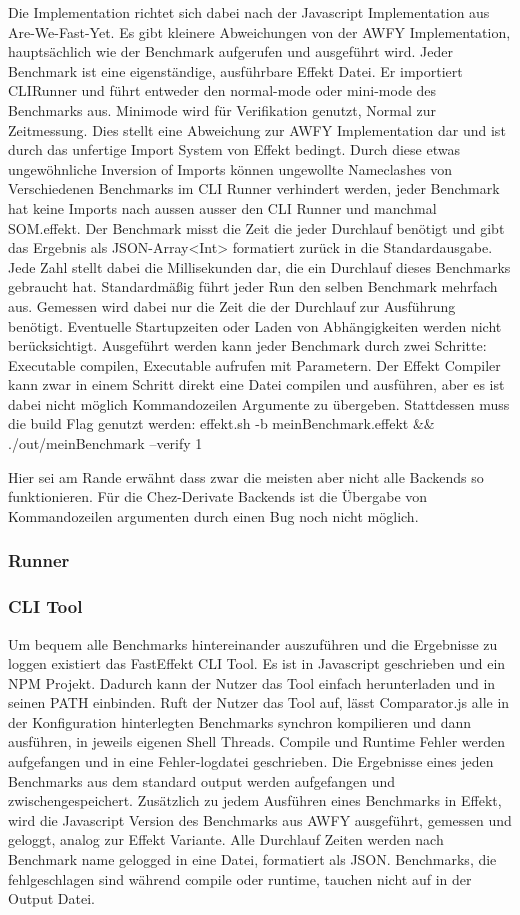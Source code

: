 Die Implementation richtet sich dabei nach der Javascript Implementation aus Are-We-Fast-Yet.
Es gibt kleinere Abweichungen von der AWFY Implementation, hauptsächlich wie der Benchmark aufgerufen und ausgeführt wird. 
Jeder Benchmark ist eine eigenständige, ausführbare Effekt Datei. Er importiert CLIRunner und führt entweder den normal-mode oder mini-mode des Benchmarks aus. Minimode wird für Verifikation genutzt, Normal zur Zeitmessung.
Dies stellt eine Abweichung zur AWFY Implementation dar und ist durch das unfertige Import System von Effekt bedingt.
Durch diese etwas ungewöhnliche Inversion of Imports können ungewollte Nameclashes von Verschiedenen Benchmarks im CLI Runner verhindert werden, jeder Benchmark hat keine Imports nach aussen ausser den CLI Runner und manchmal SOM.effekt.
Der Benchmark misst die Zeit die jeder Durchlauf benötigt und gibt das Ergebnis als JSON-Array<Int> formatiert zurück in die Standardausgabe. Jede Zahl stellt dabei die Millisekunden dar, die ein Durchlauf dieses Benchmarks gebraucht hat.
Standardmäßig führt jeder Run den selben Benchmark mehrfach aus.
Gemessen wird dabei nur die Zeit die der Durchlauf zur Ausführung benötigt. Eventuelle Startupzeiten oder Laden von Abhängigkeiten werden nicht berücksichtigt.
Ausgeführt werden kann jeder Benchmark durch zwei Schritte: Executable compilen, Executable aufrufen mit Parametern.
Der Effekt Compiler kann zwar in einem Schritt direkt eine Datei compilen und ausführen, aber es ist dabei nicht möglich Kommandozeilen Argumente zu übergeben.
Stattdessen muss die build Flag genutzt werden:
effekt.sh -b meinBenchmark.effekt && ./out/meinBenchmark --verify 1

Hier sei am Rande erwähnt dass zwar die meisten aber nicht alle Backends so funktionieren. Für die Chez-Derivate Backends ist die Übergabe von Kommandozeilen argumenten durch einen Bug noch nicht möglich.

\subsubsection{ Runner }
\subsubsection{ CLI Tool }
  
Um bequem alle Benchmarks hintereinander auszuführen und die Ergebnisse zu loggen existiert das FastEffekt CLI Tool.
Es ist in Javascript geschrieben und ein NPM Projekt. Dadurch kann der Nutzer das Tool einfach herunterladen und in seinen PATH einbinden.
Ruft der Nutzer das Tool auf, lässt Comparator.js alle in der Konfiguration hinterlegten Benchmarks synchron kompilieren und dann ausführen, in jeweils eigenen Shell Threads. Compile und Runtime Fehler werden aufgefangen und in eine Fehler-logdatei geschrieben. Die Ergebnisse eines jeden Benchmarks aus dem standard output werden aufgefangen und zwischengespeichert.
Zusätzlich zu jedem Ausführen eines Benchmarks in Effekt, wird die Javascript Version des Benchmarks aus AWFY ausgeführt, gemessen und geloggt, analog zur Effekt Variante.
Alle Durchlauf Zeiten werden nach Benchmark name gelogged in eine Datei, formatiert als JSON.
Benchmarks, die fehlgeschlagen sind während compile oder runtime, tauchen nicht auf in der Output Datei.

